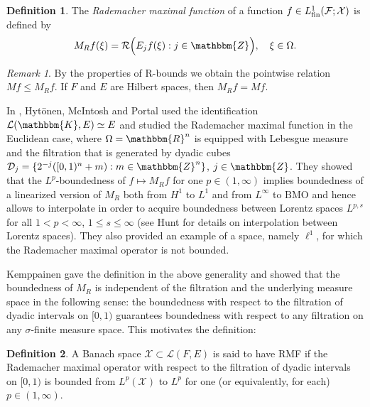 \documentclass[a4paper,10pt]{amsart}
\theoremstyle{plain}
\theoremstyle{definition}
\newtheorem*{definition*}{Definition}
\theoremstyle{remark}
\newtheorem*{remark}{Remark}
\begin{document}
\begin{definition*}
The \emph{Rademacher maximal function} of a function $f\in L_{\textup{fin}}^1(\mathcal{F} ; \mathcal{X})$ is defined by
\begin{equation*}
  M_Rf(\xi ) = \mathcal{R} \Big( E_jf(\xi ) : j\in{\mathbbm{Z}} \Big) , \quad \xi\in\Omega .
\end{equation*}
\end{definition*}

\begin{remark}

By the properties of R-bounds we obtain the pointwise relation
$Mf \leq M_Rf$. If $F$ and $E$ are Hilbert spaces, then $M_Rf=Mf$.
\end{remark}

In \cite{HMP}, Hytönen, McIntosh and Portal used the identification
$\mathcal{L}({\mathbbm{K}} , E) \simeq E$ and studied the Rademacher maximal function in the Euclidean case, where $\Omega = {\mathbbm{R}}^n$ 
is equipped with Lebesgue measure and the filtration that is generated by dyadic cubes
$\mathcal{D}_j = \{ 2^{-j} ([0,1)^n + m) : m\in{\mathbbm{Z}}^n \}$, $j\in{\mathbbm{Z}}$. 
They showed that the $L^p$-boundedness of $f\mapsto M_Rf$ for one $p\in (1,\infty )$ implies boundedness
of a linearized version of $M_R$ both from $H^1$ to $L^1$ and from $L^{\infty}$ to $\text{BMO}$
and hence allows to interpolate in order to acquire boundedness between
Lorentz spaces $L^{p,s}$ for all $1 < p < \infty$, $1\leq s \leq \infty$ (see Hunt \cite{HUNTLORENTZ}
for details on interpolation between Lorentz spaces). 
They also provided an example of a space, namely $\ell^1$, for which
the Rademacher maximal operator is not bounded.

Kemppainen \cite{RMF} gave the definition in the above generality and showed that the boundedness of $M_R$ is independent of the filtration and the
underlying measure space in the following sense: the boundedness with respect to the filtration of dyadic intervals
on $[0,1)$ guarantees boundedness with respect to any filtration on any $\sigma$-finite measure space. This motivates the definition:

\begin{definition*}
A Banach space $\mathcal{X}\subset \mathcal{L}(F,E)$ is said to have RMF
if the Rademacher maximal operator with respect to the filtration of dyadic intervals
on $[0,1)$ is bounded from $L^p(\mathcal{X})$ to $L^p$ for one (or equivalently, for each) $p\in (1,\infty )$.
\end{definition*}
\end{document}
